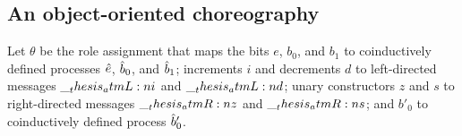 \subsection{An object-oriented choreography}

Let $\theta$ be the role assignment that maps the bits $e$, $b_0$, and $b_1$ to coinductively defined processes $\hat{e}$, $\hat{b}_0$, and $\hat{b}_1$; increments $i$ and decrements $d$ to left-directed messages $\__thesis_atmL:n {i}$ and $\__thesis_atmL:n {d}$; unary constructors $z$ and $s$ to right-directed messages $\__thesis_atmR:n {z}$ and $\__thesis_atmR:n {s}$; and $b'_0$ to coinductively defined process $\hat{b}'_0$.%

